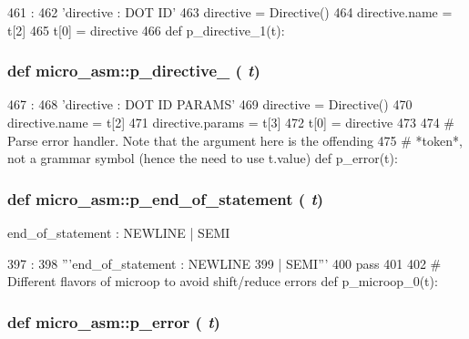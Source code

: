 \begin{DoxyCode}
461                     :
462     'directive : DOT ID'
463     directive = Directive()
464     directive.name = t[2]
465     t[0] = directive
466 
def p_directive_1(t):
\end{DoxyCode}
\hypertarget{namespacemicro__asm_a4b5544c13f30d1f1b1be7d9ac1642ae6}{
\subsubsection[{p\_\-directive\_\-1}]{\setlength{\rightskip}{0pt plus 5cm}def micro\_\-asm::p\_\-directive\_ ( {\em t})}}
\label{namespacemicro__asm_a4b5544c13f30d1f1b1be7d9ac1642ae6}



\begin{DoxyCode}
467                     :
468     'directive : DOT ID PARAMS'
469     directive = Directive()
470     directive.name = t[2]
471     directive.params = t[3]
472     t[0] = directive
473 
474 # Parse error handler.  Note that the argument here is the offending
475 # *token*, not a grammar symbol (hence the need to use t.value)
def p_error(t):
\end{DoxyCode}
\hypertarget{namespacemicro__asm_af9a07c99f70584eecf19c3bfc4fb8e26}{
\subsubsection[{p\_\-end\_\-of\_\-statement}]{\setlength{\rightskip}{0pt plus 5cm}def micro\_\-asm::p\_\-end\_\-of\_\-statement ( {\em t})}}
\label{namespacemicro__asm_af9a07c99f70584eecf19c3bfc4fb8e26}
\begin{DoxyVerb}end_of_statement : NEWLINE
                    | SEMI\end{DoxyVerb}
 


\begin{DoxyCode}
397                          :
398     '''end_of_statement : NEWLINE
399                         | SEMI'''
400     pass
401 
402 # Different flavors of microop to avoid shift/reduce errors
def p_microop_0(t):
\end{DoxyCode}
\hypertarget{namespacemicro__asm_a7e0282385fe8587f1136e99fb97817f2}{
\subsubsection[{p\_\-error}]{\setlength{\rightskip}{0pt plus 5cm}def micro\_\-asm::p\_\-error ( {\em t})}}
\label{namespacemicro__asm_a7e0282385fe8587f1136e99fb97817f2}



